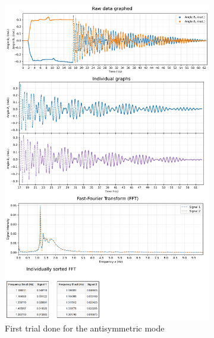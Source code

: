 \documentclass[12pt]{article}
\begin{document}
\begin{figure}[H]
    \centering
    \begin{subfigure}{0.49\linewidth}
        \centering
        \includegraphics[width=0.98\linewidth]{figs/anti pendulum (left-back_1).png}
        \caption{First trial done for the antisymmetric mode}
    \end{subfigure}
    \begin{subfigure}{0.49\linewidth}
        \centering

\end{subfigure}
\end{figure}
\end{document}
